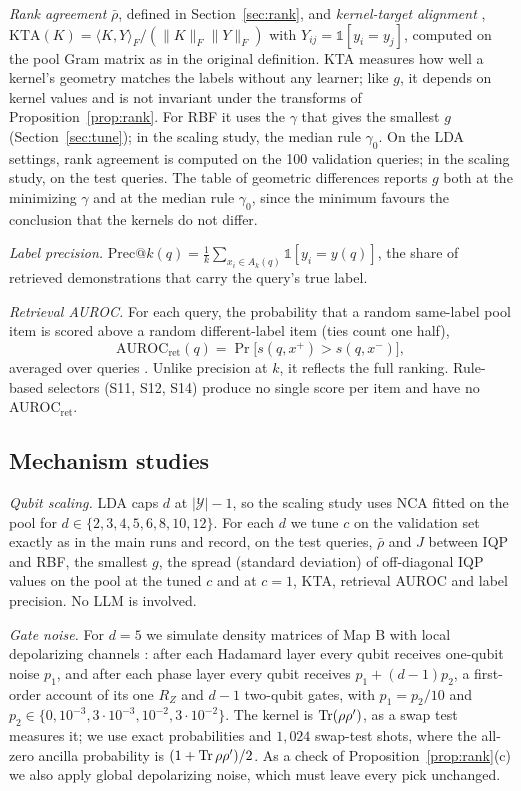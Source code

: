 \emph{Rank agreement} $\bar\rho$, defined in Section~\ref{sec:rank}, and \emph{kernel-target alignment}
\cite{cristianini2002kta}, $\mathrm{KTA}(K)=\langle K,Y\rangle_F/(\lVert K\rVert_F\lVert Y\rVert_F)$
with $Y_{ij}=\mathbb{1}[y_i=y_j]$, computed on the pool Gram matrix as in the original definition.
KTA measures how well a kernel's geometry matches the labels without any learner; like $g$, it depends
on kernel values and is not invariant under the transforms of Proposition~\ref{prop:rank}. For RBF it uses
the $\gamma$ that gives the smallest $g$ (Section~\ref{sec:tune}); in the scaling study, the median rule $\gamma_0$.
On the LDA settings, rank agreement is computed on the 100 validation queries; in the scaling study, on
the test queries. The table of geometric differences reports $g$ both at the minimizing $\gamma$ and at the
median rule $\gamma_0$, since the minimum favours the conclusion that the kernels do not differ.

\emph{Label precision.} $\mathrm{Prec}@k(q)=\frac1k\sum_{x_i\in A_k(q)}\mathbb{1}[y_i=y(q)]$, the share of
retrieved demonstrations that carry the query's true label.

\emph{Retrieval AUROC.} For each query, the probability that a random same-label pool item is scored
above a random different-label item (ties count one half),
\begin{equation}
\mathrm{AUROC}_\mathrm{ret}(q)=\Pr\bigl[s(q,x^+)>s(q,x^-)\bigr],
\label{eq:auroc}
\end{equation}
averaged over queries \cite{fawcett2006roc}. Unlike precision at $k$, it reflects the full ranking.
Rule-based selectors (S11, S12, S14) produce no single score per item and have no AUROC$_\mathrm{ret}$.

\subsection{Mechanism studies}
\label{sec:studies}
\emph{Qubit scaling.} LDA caps $d$ at $|\mathcal{Y}|-1$, so the scaling study uses NCA fitted on the pool
for $d\in\{2,3,4,5,6,8,10,12\}$. For each $d$ we tune $c$ on the validation set exactly as in the main
runs and record, on the test queries, $\bar\rho$ and $J$ between IQP and RBF, the smallest $g$, the spread
(standard deviation) of off-diagonal IQP values on the pool at the tuned $c$ and at $c=1$, KTA, retrieval
AUROC and label precision. No LLM is involved.

\emph{Gate noise.}
\label{sec:noise}
For $d=5$ we simulate density matrices of Map B with local depolarizing channels
\cite{nielsen2010quantum}: after each Hadamard layer every qubit receives one-qubit noise $p_1$, and after
each phase layer every qubit receives $p_1+(d-1)p_2$, a first-order account of its one $R_Z$ and $d-1$
two-qubit gates, with $p_1=p_2/10$ and $p_2\in\{0,10^{-3},3\cdot10^{-3},10^{-2},3\cdot10^{-2}\}$. The
kernel is $\operatorname{Tr}(\rho\rho')$, as a swap test measures it; we use exact probabilities and $1{,}024$ swap-test
shots, where the all-zero ancilla probability is $(1+\operatorname{Tr}\rho\rho')/2$. As a check of
Proposition~\ref{prop:rank}(c) we also apply global depolarizing noise, which must leave every pick
unchanged.

